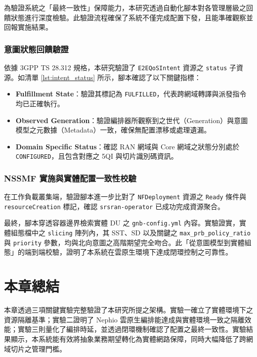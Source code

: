 為驗證系統之「最終一致性」保障能力，本研究透過自動化腳本對各管理層級之回饋狀態進行深度檢驗。此驗證流程確保了系統不僅完成配置下發，且能準確觀察並回報實施結果。

\subsubsection{意圖狀態回饋驗證}
依據 3GPP TS 28.312 規格，本研究驗證了 \texttt{E2EQoSIntent} 資源之 \texttt{status} 子資源。如清單 \ref{lst:intent_status} 所示，腳本確認了以下關鍵指標：
\begin{itemize}
    \item \textbf{Fulfillment State}：驗證其標記為 \texttt{FULFILLED}，代表跨網域轉譯與派發指令均已正確執行。
    \item \textbf{Observed Generation}：驗證編排器所觀察到之世代（Generation）與意圖模型之元數據（Metadata）一致，確保無配置漂移或處理遺漏。
    \item \textbf{Domain Specific Status}：確認 RAN 網域與 Core 網域之狀態分別處於 \texttt{CONFIGURED}，且包含對應之 5QI 與切片識別碼資訊。
\end{itemize}

\subsubsection{NSSMF 實施與實體配置一致性校驗}
在工作負載叢集端，驗證腳本進一步比對了 \texttt{NFDeployment} 資源之 \texttt{Ready} 條件與 \texttt{resourceCreation} 標記，確認 \texttt{srsran-operator} 已成功完成資源聚合。

最終，腳本穿透容器邊界檢索實體 DU 之 \texttt{gnb-config.yml} 內容。實驗證實，實體組態檔中之 \texttt{slicing} 陣列內，其 SST、SD 以及關鍵之 \texttt{max\_prb\_policy\_ratio} 與 \texttt{priority} 參數，均與北向意圖之高階期望完全吻合。此「從意圖模型到實體組態」的端到端校驗，證明了本系統在雲原生環境下達成閉環控制之可靠性。

\section{本章總結}
\label{sec:chapter_summary}

本章透過三項關鍵實驗完整驗證了本研究所提之架構。實驗一確立了實體環境下之資源隔離基準；實驗二證明了 Nephio 雲原生編排能達成與實體環境一致之隔離效能；實驗三則量化了編排時延，並透過閉環機制確認了配置之最終一致性。實驗結果顯示，本系統能有效將抽象業務期望轉化為實體網路保障，同時大幅降低了跨網域切片之管理門檻。

